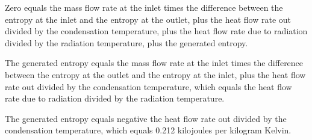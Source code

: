 Zero equals the mass flow rate at the inlet times the difference between the entropy at the inlet and the entropy at the outlet, plus the heat flow rate out divided by the condensation temperature, plus the heat flow rate due to radiation divided by the radiation temperature, plus the generated entropy.

The generated entropy equals the mass flow rate at the inlet times the difference between the entropy at the outlet and the entropy at the inlet, plus the heat flow rate out divided by the condensation temperature, which equals the heat flow rate due to radiation divided by the radiation temperature.

The generated entropy equals negative the heat flow rate out divided by the condensation temperature, which equals 0.212 kilojoules per kilogram Kelvin.